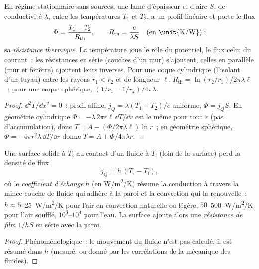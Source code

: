 \begin{proposition}\label{prop:b2:heat-conduction:resistance}
En régime stationnaire sans sources, une lame d'épaisseur $e$,
d'aire $S$, de conductivité $\lambda$, entre les températures $T_1$ et
$T_2$, a un profil linéaire et porte le flux
\[
\Phi = \frac{T_1 - T_2}{R_{\text{th}}}, \qquad
R_{\text{th}} = \frac{e}{\lambda S}\quad\text{(en \unit{K/W})} :
\]
sa \emph{résistance thermique}. La température
joue le rôle du potentiel, le flux celui du courant~: les résistances en
série (couches d'un mur) s'ajoutent, celles en parallèle (mur et
fenêtre) ajoutent leurs inverses. Pour une coque cylindrique (l'isolant d'un
tuyau) entre les rayons $r_1 < r_2$ et de longueur $\ell$,
$R_{\text{th}} = \ln(r_2/r_1)/2\pi\lambda\ell$~; pour une coque sphérique,
$(1/r_1 - 1/r_2)/4\pi\lambda$.
\end{proposition}

\begin{proof}
$\dd^2T/\dd x^2 = 0$~: profil affine, $j_Q = \lambda(T_1 - T_2)/e$
uniforme, $\Phi = j_QS$. En géométrie cylindrique $\Phi = -\lambda\,2\pi
r\ell\,\dd T/\dd r$ est le même pour tout $r$ (pas d'accumulation), donc
$T = A - (\Phi/2\pi\lambda\ell)\ln r$~; en géométrie sphérique, $\Phi =
-4\pi r^2\lambda\,\dd T/\dd r$ donne $T = A + \Phi/4\pi\lambda r$.
\end{proof}

\begin{proposition}\label{prop:b2:heat-conduction:newton}
Une surface solide à $T_{\text{s}}$ au contact d'un fluide à $T_{\text{f}}$
(loin de la surface) perd la densité de flux
\[
j_Q = h\,(T_{\text{s}} - T_{\text{f}}) ,
\]
où le \emph{coefficient d'échange} $h$ (en \unit{W/m^2/K}) résume la conduction à travers
la mince couche de fluide qui adhère à la paroi et la convection qui la
renouvelle~: $h \approx 5$--\qty{25}{W/m^2/K} pour l'air en convection naturelle ou
légère, $50$--\qty{500}{W/m^2/K} pour l'air soufflé, $10^3$--$10^4$
pour l'eau. La surface ajoute alors une \emph{résistance de film} $1/hS$ en
série avec la paroi.
\end{proposition}

\begin{proof}
Phénoménologique~: le mouvement du fluide n'est pas calculé, il est résumé
dans $h$ (mesuré, ou donné par les corrélations de la mécanique des fluides).
\end{proof}

